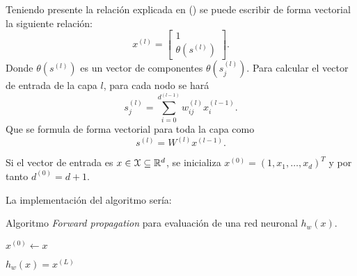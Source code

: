 Teniendo presente la relación  explicada en () se puede escribir de forma vectorial la siguiente relación: 
\begin{equation}
    x^{(l)} = 
    \left[ \begin{array}{c}
        1 \\
       \theta(s^{(l)})
        \end{array}
\right] .
\end{equation}
Donde $\theta(s^{(l)})$ es un vector de componentes $\theta(s^{(l)}_j)$. 
Para calcular el vector de entrada de la capa $l$, para cada nodo se hará
\begin{equation}
    s_j^{(l)} = \sum_{i=0}^{d^{(l-1)}} w_{i j}^{(l)}x_i^{(l-1)}.
\end{equation}
Que se formula de forma vectorial para toda la capa como 
\begin{equation}
    s^{(l)} = W^{(l)} x^{(l-1)}.
\end{equation}

Si el vector de entrada es $x \in \mathcal{X} \subseteq \mathbb{R}^d$, 
se inicializa  $x^{(0)} = (1,x_1, \ldots, x_d)^T$ y por tanto $d^{(0)} = d+1.$


La implementación del algoritmo sería:

\begin{algorithm}[H]
    \caption{Algoritmo \textit{Forward propagation} para evaluación de una red neuronal $h_w(x)$.}
    \begin{algorithmic}[1]
        \STATE $x^{(0)} \leftarrow x$ 

        \STATE {}
        \STATE $h_w(x) = x^{(L)}$ 
\end{algorithmic}
\end{algorithm}

